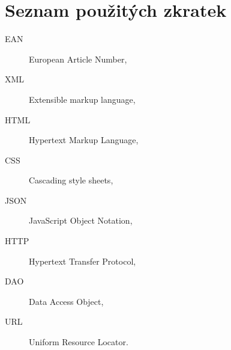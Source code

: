 \documentclass[thesis=B,czech]{FITthesis}[2012/06/26]
\begin{document}
\chapter{Seznam použitých zkratek}
\begin{description}
	\item[EAN] European Article Number,
	\item[XML] Extensible markup language,
	\item[HTML] Hypertext Markup Language,
	\item[CSS] Cascading style sheets,
	\item[JSON] JavaScript Object Notation,
	\item[HTTP] Hypertext Transfer Protocol,
	\item[DAO] Data Access Object,
	\item[URL] Uniform Resource Locator.

\end{description}
\end{document}
